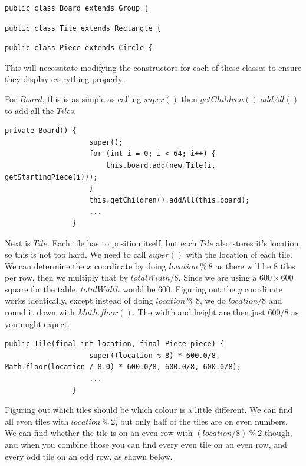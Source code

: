 \documentclass[a4paper]{report}
\begin{document}
			\begin{lstlisting}[frame=top, caption=Board.java]
				public class Board extends Group {
			\end{lstlisting}
			\begin{lstlisting}[frame=top, caption=Tile.java]
				public class Tile extends Rectangle {
			\end{lstlisting}
			\begin{lstlisting}[frame=top, caption=Piece.java]
				public class Piece extends Circle {
			\end{lstlisting}
			
			This will necessitate modifying the constructors for each of these classes to ensure they display everything properly.
			
			For $Board$, this is as simple as calling $super()$ then $getChildren().addAll()$ to add all the $Tile$s.
			
			\begin{lstlisting}[frame=top, caption=Board.java]
				private Board() {
					super();
					for (int i = 0; i < 64; i++) {
						this.board.add(new Tile(i, getStartingPiece(i)));
					}
					this.getChildren().addAll(this.board);
					...
				}
			\end{lstlisting} \bigskip
			
			Next is $Tile$. Each tile has to position itself, but each $Tile$ also stores it's location, so this is not too hard.
			We need to call $super()$ with the location of each tile. We can determine the $x$ coordinate by doing $location\ \%\ 8$ as there will be 8 tiles per row, then we multiply that by $totalWidth / 8$. Since we are using a $600\times600$ square for the table, $totalWidth$ would be $600$. Figuring out the $y$ coordinate works identically, except instead of doing $location\ \%\ 8$, we do $location / 8$ and round it down with $Math.floor()$. The width and height are then just $600/8$ as you might expect.
			
			\begin{lstlisting}[frame=top, caption=Tile.java]
				public Tile(final int location, final Piece piece) {
					super((location % 8) * 600.0/8, Math.floor(location / 8.0) * 600.0/8, 600.0/8, 600.0/8);
					...
				}
			\end{lstlisting} \bigskip
			
			Figuring out which tiles should be which colour is a little different. We can find all even tiles with $location\ \%\ 2$, but only half of the tiles are on even numbers. We can find whether the tile is on an even row with $(location / 8)\ \%\ 2$ though, and when you combine those you can find every even tile on an even row, and every odd tile on an odd row, as shown below.
			
\end{document}
